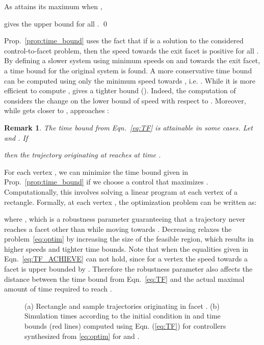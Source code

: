 \documentclass{ifacconf}
\newtheorem{remark}{Remark}
\begin{document}
	As  attains its maximum when ,
	
	gives the upper bound for all .
\qed
  
Prop.~\ref{prop:time_bound} uses the fact that if  is a solution to the considered control-to-facet problem, then the speed   towards the exit facet is positive for all . By defining a slower system using minimum speeds on  and  towards the exit facet, a time bound for the original system is found. A more conservative time bound  can be computed using only the minimum speed towards , i.e. . While it is more efficient to compute ,  gives a tighter bound (). Indeed, the computation of  considers the change on the lower bound of speed with respect to . Moreover, while  gets closer to ,  approaches :
 

\begin{remark} The time bound  from Eqn.~\eqref{eq:TF} is attainable in some cases. Let  and . If 



then the trajectory originating at   reaches  at time .
\end{remark}


For each vertex , we can minimize the time bound 
given in Prop.~\ref{prop:time_bound} if we choose a control  that maximizes . Computationally, this involves 
solving a linear program at each vertex of a rectangle. Formally, at each vertex , the optimization problem can be written as: 


where , which is a robustness parameter guaranteeing  that a trajectory never reaches a facet other than  while moving towards . Decreasing  relaxes the problem~\eqref{eq:optim} by increasing the size of the feasible region, which results in higher speeds and tighter time bounds.
Note that when  the equalities given in Eqn.~\eqref{eq:TF_ACHIEVE}  can not hold, 
since for a vertex  the speed towards a facet  is upper bounded by . 
Therefore the robustness parameter  also affects the distance between the time bound from Eqn.~\eqref{eq:TF} and the actual maximal amount of time required to reach . 
\begin{figure}
\centering
{}
\caption{(a) Rectangle  and sample trajectories originating in facet . 
(b) Simulation times according to the initial condition in  and time bounds  (red lines) computed using
Eqn. (\ref{eq:TF}) for controllers synthesized from \eqref{eq:optim} for  and .}
\label{fig:ex_r}
\end{figure} 
\end{document}
